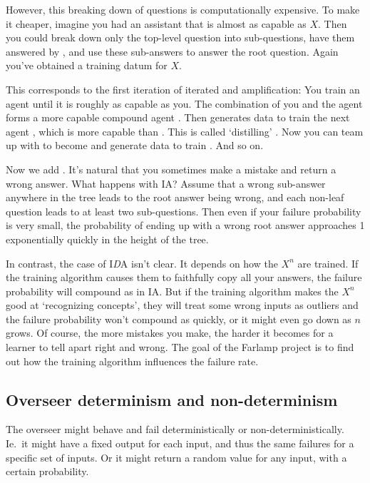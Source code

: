 \documentclass{farlamp}
\begin{document}
However, this breaking down of questions is computationally expensive. To make
it cheaper, imagine you had an assistant  that is almost as capable as
$X$. Then you could break down only the top-level question into sub-questions,
have them answered by , and use these sub-answers to answer the root
question. Again you've obtained a training datum for $X$.

This corresponds to the first iteration of iterated  and
amplification: You train an agent  until it is roughly as capable as you.
The combination of you and the agent forms a more capable compound agent .
Then  generates data to train the next agent , which is more capable
than . This is called ‘distilling’ . Now you can team up with 
to become  and generate data to train . And so on.

Now we add . It's natural that you sometimes make a mistake and
return a wrong answer. What happens with IA? Assume that a wrong sub-answer
anywhere in the tree leads to the root answer being wrong, and each non-leaf
question leads to at least two sub-questions. Then even if your failure
probability is very small, the probability of ending up with a wrong root answer
approaches 1 exponentially quickly in the height of the
tree.~\parencite{ChriRelAmp}

In contrast, the case of I\emph{D}A isn't clear. It depends on how the $X^n$ are
trained. If the training algorithm causes them to faithfully copy all your
answers, the failure probability will compound as in IA. But if the training
algorithm makes the $X^n$ good at ‘recognizing concepts’, they will treat some
wrong inputs as outliers and the failure probability won't compound as quickly,
or it might even go down as $n$ grows. Of course, the more mistakes you make,
the harder it becomes for a learner to tell apart right and wrong. The goal of
the Farlamp project is to find out how the training algorithm influences the
failure rate.


\subsection{Overseer determinism and non-determinism}

The overseer might behave and fail deterministically or non-deterministically.
Ie.\ it might have a fixed output for each input, and thus the same failures for
a specific set of inputs. Or it might return a random value for any input,
with a certain probability.
\end{document}
